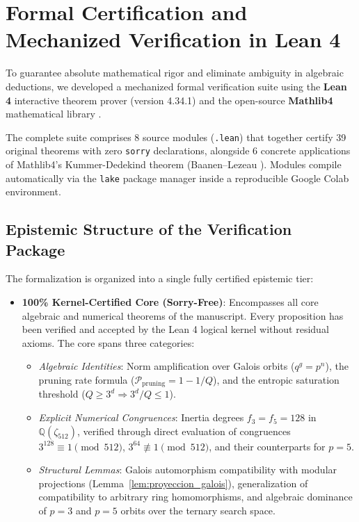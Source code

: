 \documentclass[11pt,a4paper]{article}
\theoremstyle{plain}
\theoremstyle{definition}
\numberwithin{equation}{section}
\newcommand{\QQ}{\mathbb{Q}}
\begin{document}
\section{Formal Certification and Mechanized Verification in Lean 4}
\label{sec:lean_verification}

To guarantee absolute mathematical rigor and eliminate ambiguity in algebraic deductions, we developed a mechanized formal verification suite using the \textbf{Lean 4} interactive theorem prover \cite{Moura2021} (version 4.34.1) and the open-source \textbf{Mathlib4} mathematical library \cite{Mathlib2020}.

The complete suite comprises 8 source modules (\texttt{.lean}) that together certify 39 original theorems with zero \texttt{sorry} declarations, alongside 6 concrete applications of Mathlib4's Kummer-Dedekind theorem (Baanen--Lezeau \cite{Baanen2021}). Modules compile automatically via the \texttt{lake} package manager inside a reproducible Google Colab environment.

\subsection{Epistemic Structure of the Verification Package}
\label{subsec:estratificacion_lean}

The formalization is organized into a single fully certified epistemic tier:

\begin{itemize}
    \item \textbf{100\% Kernel-Certified Core (Sorry-Free)}: Encompasses all core algebraic and numerical theorems of the manuscript. Every proposition has been verified and accepted by the Lean 4 logical kernel without residual axioms. The core spans three categories:
    \begin{itemize}
        \item \emph{Algebraic Identities}: Norm amplification over Galois orbits ($q^g = p^n$), the pruning rate formula ($\mathcal{P}_{\text{pruning}} = 1 - 1/Q$), and the entropic saturation threshold ($Q \ge 3^d \Rightarrow 3^d/Q \le 1$).
        \item \emph{Explicit Numerical Congruences}: Inertia degrees $f_3 = f_5 = 128$ in $\QQ(\zeta_{512})$, verified through direct evaluation of congruences $3^{128} \equiv 1 \pmod{512}$, $3^{64} \not\equiv 1 \pmod{512}$, and their counterparts for $p = 5$.
        \item \emph{Structural Lemmas}: Galois automorphism compatibility with modular projections (Lemma~\ref{lem:proyeccion_galois}), generalization of compatibility to arbitrary ring homomorphisms, and algebraic dominance of $p=3$ and $p=5$ orbits over the ternary search space.
    \end{itemize}
\end{itemize}
\end{document}
